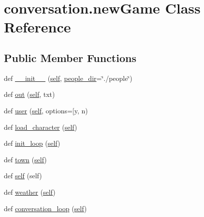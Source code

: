 \hypertarget{classconversation_1_1newGame}{}\section{conversation.\+new\+Game Class Reference}
\label{classconversation_1_1newGame}
\subsection*{Public Member Functions}
\begin{DoxyCompactItemize}
\item 
def \hyperlink{classconversation_1_1newGame_a5f61c963f551487b736182fc84feef03}{\+\_\+\+\_\+init\+\_\+\+\_\+} (\hyperlink{classconversation_1_1newGame_aec466f6f31f9a83b5d0170c60a7060aa}{self}, \hyperlink{classconversation_1_1newGame_aa8aabb7fa9c730278df1a6a2ae901e8b}{people\+\_\+dir}=\char`\"{}./people\char`\"{})
\item 
def \hyperlink{classconversation_1_1newGame_a455615fb44a9281e9c40c7d28d5867f1}{out} (\hyperlink{classconversation_1_1newGame_aec466f6f31f9a83b5d0170c60a7060aa}{self}, txt)
\item 
def \hyperlink{classconversation_1_1newGame_a789b54cc0bfabe1934df298c6574dd93}{user} (\hyperlink{classconversation_1_1newGame_aec466f6f31f9a83b5d0170c60a7060aa}{self}, options=\mbox{[}\textquotesingle{}y\textquotesingle{}, n)
\item 
def \hyperlink{classconversation_1_1newGame_a58af09829aa6ed27baa09142ca5d34b1}{load\+\_\+character} (\hyperlink{classconversation_1_1newGame_aec466f6f31f9a83b5d0170c60a7060aa}{self})
\item 
def \hyperlink{classconversation_1_1newGame_ade88b4c0aec269ec6b90925b5f81eecf}{init\+\_\+loop} (\hyperlink{classconversation_1_1newGame_aec466f6f31f9a83b5d0170c60a7060aa}{self})
\item 
def \hyperlink{classconversation_1_1newGame_a35bc0ac3765a23df7df177e9ebfe53fb}{town} (\hyperlink{classconversation_1_1newGame_aec466f6f31f9a83b5d0170c60a7060aa}{self})
\item 
def \hyperlink{classconversation_1_1newGame_aec466f6f31f9a83b5d0170c60a7060aa}{self} (self)
\item 
def \hyperlink{classconversation_1_1newGame_a7bcfe614d91e7148255ed8699d091219}{weather} (\hyperlink{classconversation_1_1newGame_aec466f6f31f9a83b5d0170c60a7060aa}{self})
\item 
def \hyperlink{classconversation_1_1newGame_a0bb04ae61ad03864ab0d42c991448909}{conversation\+\_\+loop} (\hyperlink{classconversation_1_1newGame_aec466f6f31f9a83b5d0170c60a7060aa}{self})
\end{DoxyCompactItemize}

